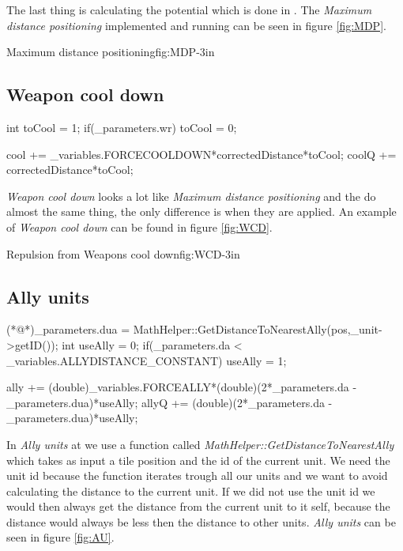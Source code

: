 	The last thing is calculating the potential which is done in . The \textit{Maximum distance positioning} implemented and running can be seen in figure \ref{fig:MDP}.

	
			{Maximum distance positioning}{fig:MDP}{-3in}

	\subsection{Weapon cool down}
		\begin{Sourcecode}[caption=Weapon cool down]
int toCool = 1;
if(_parameters.wr)
	toCool = 0;
	
cool += _variables.FORCECOOLDOWN*correctedDistance*toCool;
coolQ += correctedDistance*toCool;
\end{Sourcecode}	
	\textit{Weapon cool down} looks a lot like \textit{Maximum distance positioning} and the do almost the same thing, the only difference is when they are applied. An example of \textit{Weapon cool down} can be found in figure \ref{fig:WCD}.
	
		{Repulsion from Weapons cool down}{fig:WCD}{-3in}

	\subsection{Ally units}
		\begin{Sourcecode}[caption=Ally units]
(*@\lnote@*)_parameters.dua = MathHelper::GetDistanceToNearestAlly(pos,_unit->getID());
int useAlly = 0;
if(_parameters.da < _variables.ALLYDISTANCE_CONSTANT)
	useAlly = 1;

ally += (double)_variables.FORCEALLY*(double)(2*_parameters.da - _parameters.dua)*useAlly;
allyQ += (double)(2*_parameters.da - _parameters.dua)*useAlly;
\end{Sourcecode}	
	In \textit{Ally units} at  we use a function called \textit{MathHelper::GetDistanceToNearestAlly} which takes as input a tile position and the id of the current unit. We need the unit id because the function iterates trough all our units and we want to avoid calculating the distance to the current unit. If we did not use the unit id we would then always get the distance from the current unit to it self, because the distance would always be less then the distance to other units. \textit{Ally units} can be seen in figure \ref{fig:AU}.
	
